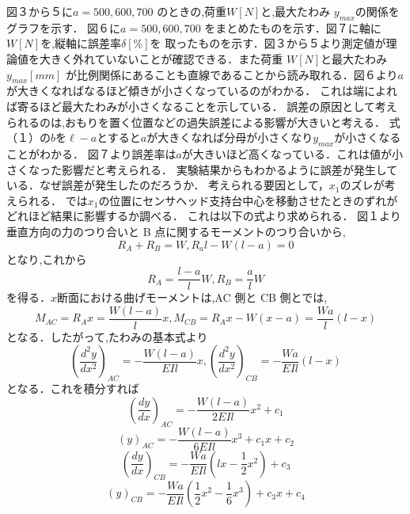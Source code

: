 \documentclass[a4paper,12pt]{jsarticle}
\begin{document}
\begin{enumerate}
\quad 図３から５に$a = 500,600,700$ のときの,荷重$ W [N] $と,最大たわみ $y_{max}$の関係をグラフを示す．
図６に$a = 500,600,700$ をまとめたものを示す．図７に軸に$ W [N]$を,縦軸に誤差率$ \delta [\%]$を
取ったものを示す．図３から５より測定値が理論値を大きく外れていないことが確認できる．また荷重 $W [N] $と最大たわみ$ y_{max}[mm]$
が比例関係にあることも直線であることから読み取れる．図６より$a$が大きくなればなるほど傾きが小さくなっているのがわかる．
これは端によれば寄るほど最大たわみが小さくなることを示している．
誤差の原因として考えられるのは,おもりを置く位置などの過失誤差による影響が大きいと考える．
式（１）の$b$を$\ell-a$とすると$a$が大きくなれば分母が小さくなり$y_{max}$が小さくなることがわかる．
図７より誤差率は$a$が大きいほど高くなっている．これは値が小さくなった影響だと考えられる．
実験結果からもわかるように誤差が発生している．なぜ誤差が発生したのだろうか．
考えられる要因として，$x_1$のズレが考えられる．
では$x_1$の位置にセンサヘッド支持台中心を移動させたときのずれがどれほど結果に影響するか調べる．
これは以下の式より求められる．
図１より垂直方向の力のつり合いと B 点に関するモーメントのつり合いから,
\begin{equation} 
  R_A+R_B=W,R_al-W(l-a)=0
\end{equation}
となり,これから
\begin{equation} 
  R_A={\dfrac{l-a}{l}W},R_B={\dfrac{a}{l}W}
\end{equation}
を得る．$x$断面における曲げモーメントは,AC 側と CB 側とでは,
\begin{equation} 
  M_{AC}=R_Ax={\dfrac{W(l-a)}{l}x},M_{CB}=R_Ax-W(x-a)={\dfrac{Wa}{l}(l-x)}
\end{equation}
となる．したがって,たわみの基本式より
\begin{equation} 
  {(\dfrac{d^2y}{dx^2})_{AC}}={-\dfrac{W(l-a)}{EIl}x},
  {(\dfrac{d^2y}{dx^2})_{CB}}={-\dfrac{Wa}{EIl}(l-x)}
\end{equation}
となる．これを積分すれば
\begin{equation} 
  {(\dfrac{dy}{dx})_{AC}}={-\dfrac{W(l-a)}{2EIl}x^2+c_1}
\end{equation}
\begin{equation} 
  {(y)_{AC}}={-\dfrac{W(l-a)}{6EIl}x^3+c_1x+c_2}
\end{equation}
\begin{equation} 
  {(\dfrac{dy}{dx})_{CB}}={-\dfrac{Wa}{EIl}(lx-\dfrac{1}{2}x^2)+c_3}
\end{equation}
\begin{equation} 
  {(y)_{CB}}={-\dfrac{Wa}{EIl}(\dfrac{1}{2}x^2-\dfrac{1}{6}x^3)+c_3x+c_4}

\end{equation}
\end{enumerate}
\end{document}
